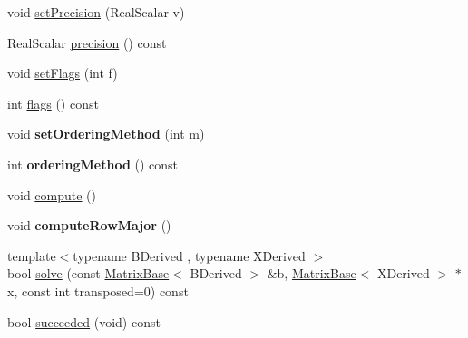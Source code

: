 \begin{DoxyCompactItemize}
\item 
void \hyperlink{class_eigen_1_1_skyline_inplace_l_u_a1c057a7dec39b8b196d49d7d411ea999}{set\+Precision} (Real\+Scalar v)
\item 
Real\+Scalar \hyperlink{class_eigen_1_1_skyline_inplace_l_u_a050bcbe008f2ddeea4f6d5872e0daca5}{precision} () const
\item 
void \hyperlink{class_eigen_1_1_skyline_inplace_l_u_afd8013d183aaca495dfd10d819e61aaf}{set\+Flags} (int f)
\item 
int \hyperlink{class_eigen_1_1_skyline_inplace_l_u_a5e491f7643c548ac81d3f4a7e432be19}{flags} () const
\item 
\mbox{\label{class_eigen_1_1_skyline_inplace_l_u_a6709f4ee810842009a66b47f20dbbfd0}} 
void {\bfseries set\+Ordering\+Method} (int m)
\item 
\mbox{\label{class_eigen_1_1_skyline_inplace_l_u_ad7721922f4187358740de21788a4495d}} 
int {\bfseries ordering\+Method} () const
\item 
void \hyperlink{class_eigen_1_1_skyline_inplace_l_u_a590e9a988b2843712a29a541787e6c38}{compute} ()
\item 
\mbox{\label{class_eigen_1_1_skyline_inplace_l_u_a218636f299e9c066a07cb4be660267d1}} 
void {\bfseries compute\+Row\+Major} ()
\item 
{\footnotesize template$<$typename B\+Derived , typename X\+Derived $>$ }\\bool \hyperlink{class_eigen_1_1_skyline_inplace_l_u_a53c846d76559221d2bcf336a2da4d68f}{solve} (const \hyperlink{group___core___module_class_eigen_1_1_matrix_base}{Matrix\+Base}$<$ B\+Derived $>$ \&b, \hyperlink{group___core___module_class_eigen_1_1_matrix_base}{Matrix\+Base}$<$ X\+Derived $>$ $\ast$x, const int transposed=0) const
\item 
bool \hyperlink{class_eigen_1_1_skyline_inplace_l_u_abd633c27a0a342fb392b6af3ceb800ba}{succeeded} (void) const
\end{DoxyCompactItemize}
